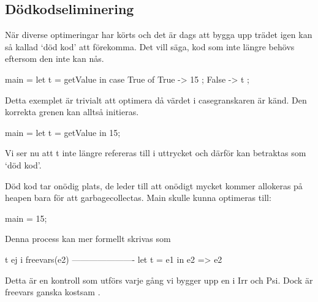 \documentclass[../Optimise]{subfiles}
\begin{document}
\subsection{Dödkodseliminering}


När diverse optimeringar har körts och det är dags att bygga upp trädet igen kan
så kallad `död kod' att förekomma. Det vill säga, kod som inte längre 
behövs eftersom den inte kan nås.

\begin{codeEx}
main = let t = getValue in
            case True of
              { True  -> 15
              ; False -> t
              };
\end{codeEx}

Detta exemplet är trivialt att optimera då värdet i casegranskaren är känd. 
Den korrekta grenen kan alltså initieras.

\begin{codeEx}
main = let t = getValue in 15;
\end{codeEx}


Vi ser nu att t inte längre refereras till i uttrycket  
och därför kan  betraktas som `död kod'. 

Död kod tar onödig plats, de leder till att onödigt mycket kommer 
allokeras på heapen bara för att garbagecollectas. Main skulle
kunna optimeras till:

\begin{codeEx}
main = 15;
\end{codeEx}

Denna process kan mer formellt skrivas som

\begin{codeEx}
 t ej i freevars(e2)
----------------------
let t = e1 in e2 => e2
\end{codeEx}

Detta är en kontroll som utförs varje gång vi bygger upp en  
i Irr och Psi. Dock är freevars ganska kostsam 
.
\end{document}

